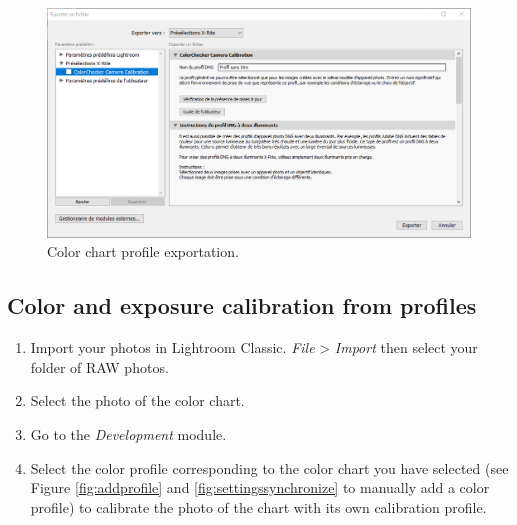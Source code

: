 \documentclass[
]{book}
\begin{document}
\begin{figure}

{\centering \includegraphics[width=0.8\linewidth]{Figures/x_rite_preselection} 

}

\caption{Color chart profile exportation.}\label{fig:xritepreselection}
\end{figure}

\hypertarget{color-and-exposure-calibration-from-profiles}{%
\subsection{Color and exposure calibration from profiles}\label{color-and-exposure-calibration-from-profiles}}

\begin{enumerate}
\def\labelenumi{\arabic{enumi}.}
\item
  Import your photos in Lightroom Classic. \emph{File} \textgreater{} \emph{Import} then
  select your folder of RAW photos.
\item
  Select the photo of the color chart.
\item
  Go to the \emph{Development} module.
\item
  Select the color profile corresponding to the color chart you have selected (see Figure \ref{fig:addprofile} and \ref{fig:settingssynchronize} to manually add a color profile) to calibrate the photo of the chart with its own calibration profile.
\end{enumerate}
\end{document}
